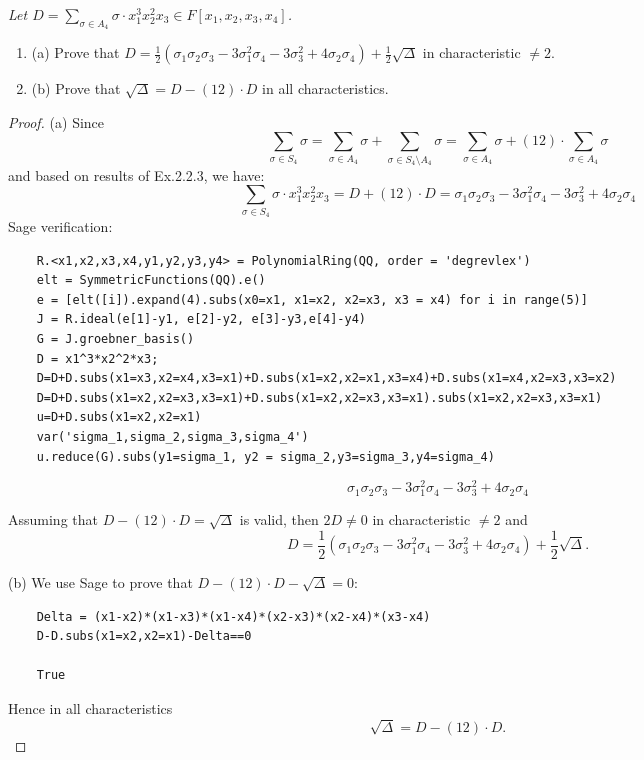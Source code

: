 \documentclass[11pt,a4paper]{article}
\newcommand{\be} {\begin{enumerate}}
\newcommand{\ee} {\end{enumerate}}
\begin{document}
{\it Let $D=\sum_{\sigma \in A_4} \sigma \cdot x_1^3x_2^2x_3 \in F[x_1,x_2,x_3,x_4]$.
\be
\item[(a)] Prove that $D=\frac{1}{2}(\sigma_1\sigma_2\sigma_3 -3 \sigma_1^2 \sigma_4 -3\sigma_3^2 + 4\sigma_2 \sigma_4)+\frac{1}{2}\sqrt{\Delta}$ in characteristic $\ne 2$.
\item[(b)] Prove that $\sqrt{\Delta}=D-(12)\cdot D$ in all characteristics.
\ee
\begin{proof}
\item[(a)] Since $$\sum_{\sigma \in S_4} \sigma =\sum_{\sigma \in A_4} \sigma + \sum_{\sigma \in S_4 \setminus A_4} \sigma =\sum_{\sigma \in A_4} \sigma + (12)\cdot \sum_{\sigma \in  A_4} \sigma $$ and based on results of Ex.2.2.3, we have:
$$\sum_{\sigma \in S_4} \sigma \cdot x_1^3x_2^2x_3 = D+(12)\cdot D =\sigma_1\sigma_2\sigma_3 -3 \sigma_1^2 \sigma_4 -3\sigma_3^2 + 4\sigma_2 \sigma_4 $$
Sage verification:
\begin{verbatim}
    R.<x1,x2,x3,x4,y1,y2,y3,y4> = PolynomialRing(QQ, order = 'degrevlex')
    elt = SymmetricFunctions(QQ).e()
    e = [elt([i]).expand(4).subs(x0=x1, x1=x2, x2=x3, x3 = x4) for i in range(5)]
    J = R.ideal(e[1]-y1, e[2]-y2, e[3]-y3,e[4]-y4)
    G = J.groebner_basis()
    D = x1^3*x2^2*x3;
    D=D+D.subs(x1=x3,x2=x4,x3=x1)+D.subs(x1=x2,x2=x1,x3=x4)+D.subs(x1=x4,x2=x3,x3=x2)
    D=D+D.subs(x1=x2,x2=x3,x3=x1)+D.subs(x1=x2,x2=x3,x3=x1).subs(x1=x2,x2=x3,x3=x1)
    u=D+D.subs(x1=x2,x2=x1)
    var('sigma_1,sigma_2,sigma_3,sigma_4')
    u.reduce(G).subs(y1=sigma_1, y2 = sigma_2,y3=sigma_3,y4=sigma_4)
\end{verbatim}
$$\sigma_1\sigma_2\sigma_3 -3 \sigma_1^2 \sigma_4 -3\sigma_3^2 + 4\sigma_2 \sigma_4 $$

Assuming that $D-(12)\cdot D=\sqrt{\Delta}$ is valid, then $2D \ne 0$ in characteristic $\ne 2$ and
$$D=\frac{1}{2}(\sigma_1\sigma_2\sigma_3 -3 \sigma_1^2 \sigma_4 -3\sigma_3^2 + 4\sigma_2 \sigma_4)+\frac{1}{2}\sqrt{\Delta}.$$
\item[(b)] We use Sage to prove that $D-(12)\cdot D-\sqrt{\Delta}=0$:

\begin{verbatim}
    Delta = (x1-x2)*(x1-x3)*(x1-x4)*(x2-x3)*(x2-x4)*(x3-x4)
    D-D.subs(x1=x2,x2=x1)-Delta==0
    
    True
\end{verbatim}
Hence in all characteristics  $$\sqrt{\Delta}=D-(12)\cdot D.$$
\end{proof}
}
\end{document}
